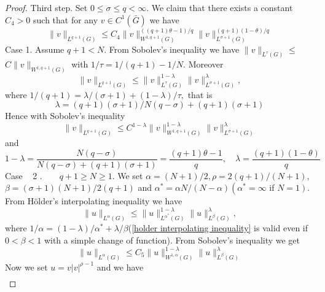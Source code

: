 \begin{proof}
Third step. Set $0 \leq \sigma \leq q<\infty$. We claim that there exists a constant $C_{4}>0$ such that for any $v \in C^{1}(\bar{G})$ we have
\begin{equation}\label{claim equation}
	\|v\|_{L^{q+1}(G)} \leq C_{4}\|v\|_{W^{1, q+1}(G)}^{((q+1) \theta-1) / q}\|v\|_{L^{\sigma+1}(G)}^{(q+1)(1-\theta) / q}
\end{equation}
\textrm{Case 1. } Assume $q+1<N$. From Sobolev's inequality we have $\|v\|_{L^{\tau}(G)} \leq$ $C\|v\|_{W^{1, q+1}(G)}$ with $1 / \tau=1 /(q+1)-1 / N .$ Moreover
\begin{equation}\label{lp interpolation inequality 1}
	\|v\|_{L^{q+1}(G)} \leq\|v\|_{L^{\tau}(G)}^{1-\lambda}\|v\|_{L^{\sigma+1}(G)}^{\lambda},
\end{equation}
where $1 /(q+1)=\lambda /(\sigma+1)+(1-\lambda) / \tau,$ that is
\begin{equation*}
	\lambda=(q+1)(\sigma+1) / N(q-\sigma)+(q+1)(\sigma+1)
\end{equation*}
Hence with Sobolev's inequality
\begin{equation}\label{sobolev inequality}
	\|v\|_{L^{q+1}(G)} \leq C^{1-\lambda}\|v\|_{W^{1, q+1}(G)}^{1-\lambda}\|v\|_{L^{\sigma+1}(G)}^{\lambda}
\end{equation}
and
\begin{equation*}
	1-\lambda=\frac{N(q-\sigma)}{N(q-\sigma)+(q+1)(\sigma+1)}=\frac{(q+1) \theta-1}{q}, \quad \lambda=\frac{(q+1)(1-\theta)}{q}
\end{equation*}
\textrm{Case } ~ 2 . ~  ~ $q+1 \geq N \geq 1$. We set $\alpha=(N+1) / 2, \rho=2(q+1) /(N+1)$, $\beta=(\sigma+1)(N+1) / 2(q+1)$ and $\alpha^{*}=\alpha N /(N-\alpha)\left(\alpha^{*}=\infty\right.$ if $\left.N=1\right) .$ From
H\"{o}lder's interpolating inequality we have
\begin{equation}\label{holder interpolating inequality}
	\|u\|_{L^{\alpha}(G)} \leq\|u\|_{L^{\alpha^ *}(G)}^{1-\lambda}\|u\|_{L^{\beta}(G)}^{\lambda},
\end{equation}
where $1 / \alpha=(1-\lambda) / \alpha^{*}+\lambda / \beta$(\eqref{holder interpolating inequality} is valid even if $0<\beta<1$ with a simple change of function). From Sobolev's inequality we get
\begin{equation}
\|u\|_{L^{\alpha}(G)} \leq C_{5}\|u\|_{W^{1, \alpha}(G)}^{1-\lambda}\|u\|_{L^{\beta}(G)}^{\lambda}
\end{equation}
Now we set $u=v|v|^{\rho-1}$ and we have
\begin{equation*}
	\begin{array}{c}

\end{array}
\end{equation*}
\end{proof}
